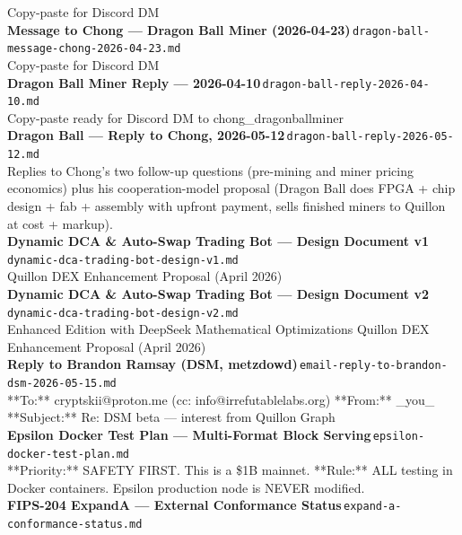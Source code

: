 \documentclass[11pt,a4paper]{article}
\begin{document}
Copy-paste for Discord DM\\[6pt]
\noindent\textbf{Message to Chong --- Dragon Ball Miner (2026-04-23)}\,\textcolor{qgray}{\small \texttt{dragon-ball-message-chong-2026-04-23.md}}\\
Copy-paste for Discord DM\\[6pt]
\noindent\textbf{Dragon Ball Miner Reply --- 2026-04-10}\,\textcolor{qgray}{\small \texttt{dragon-ball-reply-2026-04-10.md}}\\
Copy-paste ready for Discord DM to chong\_dragonballminer\\[6pt]
\noindent\textbf{Dragon Ball --- Reply to Chong, 2026-05-12}\,\textcolor{qgray}{\small \texttt{dragon-ball-reply-2026-05-12.md}}\\
Replies to Chong's two follow-up questions (pre-mining and miner pricing economics) plus his cooperation-model proposal (Dragon Ball does FPGA + chip design + fab + assembly with upfront payment, sells finished miners to Quillon at cost + markup).\\[6pt]
\noindent\textbf{Dynamic DCA \& Auto-Swap Trading Bot --- Design Document v1}\,\textcolor{qgray}{\small \texttt{dynamic-dca-trading-bot-design-v1.md}}\\
Quillon DEX Enhancement Proposal (April 2026)\\[6pt]
\noindent\textbf{Dynamic DCA \& Auto-Swap Trading Bot --- Design Document v2}\,\textcolor{qgray}{\small \texttt{dynamic-dca-trading-bot-design-v2.md}}\\
Enhanced Edition with DeepSeek Mathematical Optimizations Quillon DEX Enhancement Proposal (April 2026)\\[6pt]
\noindent\textbf{Reply to Brandon Ramsay (DSM, metzdowd)}\,\textcolor{qgray}{\small \texttt{email-reply-to-brandon-dsm-2026-05-15.md}}\\
**To:** cryptskii@proton.me (cc: info@irrefutablelabs.org) **From:** \_you\_ **Subject:** Re: DSM beta --- interest from Quillon Graph\\[6pt]
\noindent\textbf{Epsilon Docker Test Plan --- Multi-Format Block Serving}\,\textcolor{qgray}{\small \texttt{epsilon-docker-test-plan.md}}\\
**Priority:** SAFETY FIRST. This is a \$1B mainnet. **Rule:** ALL testing in Docker containers. Epsilon production node is NEVER modified.\\[6pt]
\noindent\textbf{FIPS-204 ExpandA --- External Conformance Status}\,\textcolor{qgray}{\small \texttt{expand-a-conformance-status.md}}\\
\end{document}
